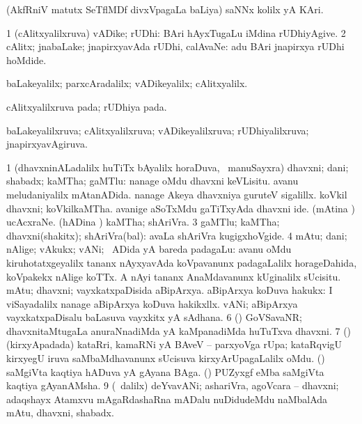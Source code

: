 {{{{{{{{{{{{\bentry
{} 
\gl{\nA}
\expl{}
\bmng
 (AkfRniV matutx SeTflMDf divxVpagaLa baLiya) saNNx kolilx yA KAri. 
\emng
\eentry

\bentry 
{} 
\gl{\nA}
\expl{}
\bmng
\bnum
\num{1} (cAlitxyalilxruva) vADike; rUDhi:  BAri hAyxTugaLu iMdina rUDhiyAgive. 
\num{2} cAlitx; jnabaLake; jnapirxyavAda rUDhi, calAvaNe:  adu BAri jnapirxya rUDhi hoMdide. 
\enum
\emng

\noindent 
\gl{\pagu}
\expl{}
\bmng
  baLakeyalilx; parxcAradalilx; vADikeyalilx; cAlitxyalilx. 
\emng
\eentry

\bentry 
{} 
\gl{\nA}
\expl{}
\bmng
 cAlitxyalilxruva pada; rUDhiya pada. 
\emng
\eentry

\bentry 
{} 
\gl{\gu}
\expl{}
\bmng
 baLakeyalilxruva; cAlitxyalilxruva; vADikeyalilxruva; rUDhiyalilxruva; jnapirxyavAgiruva. 
\emng
\eentry

\bentry 
{} 
\gl{\nA}
\expl{}
\bmng
\bnum
\num{1} (dhavxninALadalilx huTiTx bAyalilx horaDuva, \kanmu\ manuSayxra) dhavxni; dani; shabadx; kaMTha; gaMTlu:  nanage oMdu dhavxni keVLisitu.  avanu meludaniyalilx mAtanADida.  nanage Akeya dhavxniya guruteV sigalillx.  koVkil dhavxni; koVkilkaMTha.  avanige aSoTxMdu gaTiTxyAda dhavxni ide. 
\banum
{} (mAtina \vi) ucAcxraNe. 
 (hADina \vi) kaMTha; shAriVra. 
\eanum
\numie
\num{3} gaMTlu; kaMTha; dhavxni(shakitx); shAriVra(bal):  avaLa shAriVra kugigxhoVgide. 
\num{4} mAtu; dani; nAlige; vAkukx; vANi; \kanmu\ ADida yA bareda padagaLu:  avanu oMdu kiruhotatxgeyalilx tananx nAyxyavAda koVpavanunx padagaLalilx horageDahida, koVpakekx nAlige koTTx.  A nAyi tananx AnaMdavanunx kUginalilx sUcisitu. 
\banum
{} mAtu; dhavxni; vayxkatxpaDisida aBipArxya. 
 aBipArxya koDuva hakukx:  I viSayadalilx nanage aBipArxya koDuva hakikxllx. 
 vANi; aBipArxya vayxkatxpaDisalu baLasuva vayxkitx yA sAdhana. 
\eanum
\numie
\num{6} (\dhavxni) GoVSavaNR; dhavxnitaMtugaLa anuraNnadiMda yA kaMpanadiMda huTuTxva dhavxni. 
\num{7} (\vAyx) (kirxyApadada) kataRri, kamaRNi yA BAveV -- parxyoVga rUpa; kataRqvigU kirxyegU iruva saMbaMdhavanunx sUcisuva kirxyArUpagaLalilx oMdu. 
\banum
{} (\saM) saMgiVta kaqtiya hADuva yA gAyana BAga. 
 (\saM) PUZyxgf eMba saMgiVta kaqtiya gAyanAMsha. 
\eanum
\numie
\num{9} (\sA\ \bava dalilx) deYvavANi; ashariVra, agoVcara -- dhavxni; adaqshayx Atamxvu mAgaRdashaRna mADalu nuDidudeMdu naMbalAda mAtu, dhavxni, shabadx. 
\enum
\emng

}}}}}}}}}}}}
